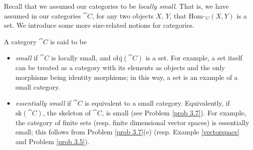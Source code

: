 \vspace*{1em}

Recall that we assumed our categories to be \emph{locally small}. That is, we have assumed in our categories $\cat{C}$, for any two objects $X,\,Y$, that $\mathrm{Hom}_{\cat{C}}(X,Y)$ is a set. We introduce some more size-related notions for categories.
\begin{definition}
A category $\cat{C}$ is said to be 
\begin{itemize}
\item \emph{small} if $\cat{C}$ is locally small, and $\mathrm{obj}(\cat{C})$ is a set. For example, a set itself can be treated as a category with its elements as objects and the only morphisms being identity morphisms; in this way, a set is an example of a small category.
\item \emph{essentially small} if $\cat{C}$ is equivalent to a small category. Equivalently, if $\mathrm{sk}(\cat{C})$, the skeleton of $\cat{C}$, is small (see Problem \ref{prob 3.7}). For example, the category of finite sets (resp. finite dimensional vector spaces) is essentially small; this follows from Problem \ref{prob 3.7}(e) (resp. Example \ref{vectorspace} and Problem \ref{prob 3.5}).
\end{itemize}
\end{definition}

\vspace*{0.1in}

